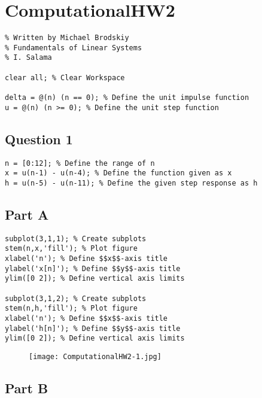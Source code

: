 \documentclass[10pt]{article}
\begin{document}
{\Huge\section*{ComputationalHW2}}

\tableofcontents
\vspace*{4em}

\begin{lstlisting}
% Written by Michael Brodskiy
% Fundamentals of Linear Systems
% I. Salama

clear all; % Clear Workspace

delta = @(n) (n == 0); % Define the unit impulse function
u = @(n) (n >= 0); % Define the unit step function
\end{lstlisting}


{}
\subsection*{Question 1}

\begin{lstlisting}
n = [0:12]; % Define the range of n
x = u(n-1) - u(n-4); % Define the function given as x
h = u(n-5) - u(n-11); % Define the given step response as h
\end{lstlisting}


{}
\subsection*{Part A}

\begin{lstlisting}
subplot(3,1,1); % Create subplots
stem(n,x,'fill'); % Plot figure
xlabel('n'); % Define $$x$$-axis title
ylabel('x[n]'); % Define $$y$$-axis title
ylim([0 2]); % Define vertical axis limits

subplot(3,1,2); % Create subplots
stem(n,h,'fill'); % Plot figure
xlabel('n'); % Define $$x$$-axis title
ylabel('h[n]'); % Define $$y$$-axis title
ylim([0 2]); % Define vertical axis limits
\end{lstlisting}
\begin{figure}[!ht]
\texttt{[image: ComputationalHW2-1.jpg]}
\end{figure}


{}
\subsection*{Part B}
\end{document}
